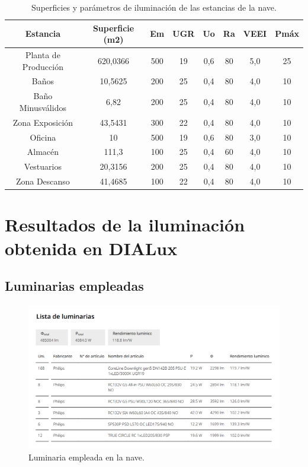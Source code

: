 \documentclass[../main.tex]{subfiles}
\begin{document}
\begin{table}[H]
    \centering
    \begin{tabular}{c | c | c | c | c | c | c | c }
         Estancia & Superficie (m2) & Em & UGR & Uo  & Ra & VEEI & Pmáx \\ \hline
         Planta de Producción & 620,0366 & 500 & 19 & 0,6 & 80 & 5,0 & 25 \\
         Baños & 10,5625 & 200 & 25 & 0,4 & 80 & 4,0 & 10 \\
         Baño Minusválidos & 6,82 & 200 & 25 & 0,4 & 80 & 4,0 & 10 \\
         Zona Exposición & 43,5431 & 300 & 22 & 0,4 & 80 & 4,0 & 10 \\
         Oficina & 10 & 500 & 19 & 0,6 & 80 & 3,0 & 10 \\
         Almacén & 111,3 & 100 & 25 & 0,4 & 60 & 4,0 & 10 \\
         Vestuarios & 20,3156 & 200 & 25 & 0,4 & 80 & 4,0 & 10 \\
         Zona Descanso & 41,4685 & 100 & 22 & 0,4 & 80 & 4,0 & 10 \\
    \end{tabular}
    \caption{Superficies y parámetros de iluminación de las estancias de la nave.}
\end{table}

\section{Resultados de la iluminación obtenida en DIALux}
\subsection{Luminarias empleadas}
\begin{figure}[H]
    \centering
    \includegraphics[width=0.75\linewidth]{Imagenes/Lista de luminarias.png}
    \caption{Luminaria empleada en la nave.}
\end{figure}
\end{document}
